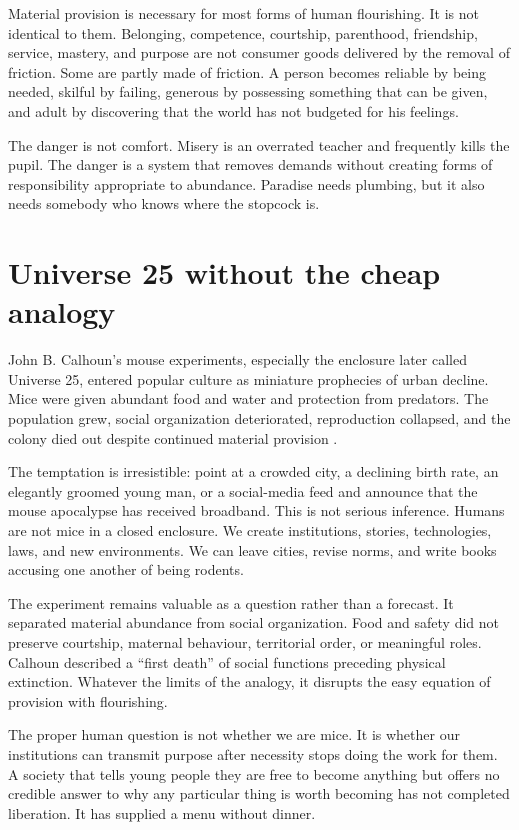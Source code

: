 \documentclass[12pt,a4paper]{book}
\begin{document}
Material provision is necessary for most forms of human flourishing.  It is
not identical to them.  Belonging, competence, courtship, parenthood,
friendship, service, mastery, and purpose are not consumer goods delivered by
the removal of friction.  Some are partly made of friction.  A person becomes
reliable by being needed, skilful by failing, generous by possessing something
that can be given, and adult by discovering that the world has not budgeted
for his feelings.

The danger is not comfort.  Misery is an overrated teacher and frequently kills
the pupil.  The danger is a system that removes demands without creating forms
of responsibility appropriate to abundance.  Paradise needs plumbing, but it
also needs somebody who knows where the stopcock is.

\section{Universe 25 without the cheap analogy}

John B. Calhoun's mouse experiments, especially the enclosure later called
Universe 25, entered popular culture as miniature prophecies of urban decline.
Mice were given abundant food and water and protection from predators.  The
population grew, social organization deteriorated, reproduction collapsed,
and the colony died out despite continued material provision
\cite{calhoun1962,calhoun1973}.

The temptation is irresistible: point at a crowded city, a declining birth
rate, an elegantly groomed young man, or a social-media feed and announce that
the mouse apocalypse has received broadband.  This is not serious inference.
Humans are not mice in a closed enclosure.  We create institutions, stories,
technologies, laws, and new environments.  We can leave cities, revise norms,
and write books accusing one another of being rodents.

The experiment remains valuable as a question rather than a forecast.  It
separated material abundance from social organization.  Food and safety did
not preserve courtship, maternal behaviour, territorial order, or meaningful
roles.  Calhoun described a ``first death'' of social functions preceding
physical extinction.  Whatever the limits of the analogy, it disrupts the
easy equation of provision with flourishing.

The proper human question is not whether we are mice.  It is whether our
institutions can transmit purpose after necessity stops doing the work for
them.  A society that tells young people they are free to become anything but
offers no credible answer to why any particular thing is worth becoming has
not completed liberation.  It has supplied a menu without dinner.
\end{document}
